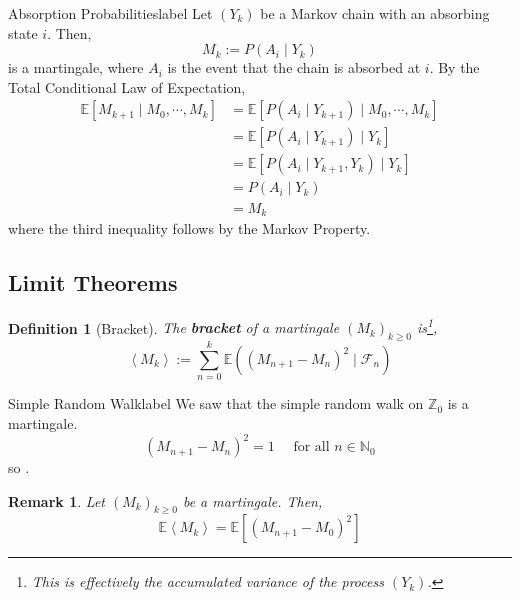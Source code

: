 \documentclass{tufte-handout}
\newtheorem{defn}[thm]{Definition}
\newtheorem{rmk}[thm]{Remark}
\begin{document}
\begin{ex}{Absorption Probabilities}{label}
  Let $(Y_k)$ be a Markov chain with an absorbing state $i$. Then,
  \[M_k := P(A_i \mid Y_k)\]
  \noindent is a martingale, where $A_i$ is the event that the chain is absorbed at $i$. By the Total Conditional Law of Expectation,
  \begin{align*}
    \mathbb{E}[M_{k+1} \mid M_0, \cdots, M_k] &= \mathbb{E}[P(A_i \mid Y_{k+1}) \mid M_0, \cdots, M_k] \\
                                              &= \mathbb{E}[P(A_i \mid Y_{k+1}) \mid Y_k] \\
                                              &= \mathbb{E}[P(A_i \mid Y_{k+1}, Y_k) \mid Y_k] \\
                                              &= P(A_i \mid Y_k) \\
                                              &= M_k
  \end{align*}
  \noindent where the third inequality follows by the Markov Property.
\end{ex}

\subsection{Limit Theorems}
\begin{defn}[Bracket]
  The \textbf{bracket} of a martingale $(M_k)_{k \geq 0}$ is\footnote{This is effectively the accumulated variance of the process $(Y_k)$.},
  \[\left\langle M_{k}\right\rangle:=\sum_{n=0}^{k} \mathbb{E}\left(\left(M_{n+1}-M_{n}\right)^{2} \mid \mathcal{F}_{n}\right)\]
\end{defn}

\begin{ex}{Simple Random Walk}{label}
  We saw that the simple random walk on $\mathbb{Z}_0$ is a martingale. 
  \[(M_{n+1} - M_n)^2 = 1 \quad \text{ for all $n \in \mathbb{N}_0$}\]
  \noindent so .
\end{ex}

\begin{rmk}
  Let $(M_k)_{k \geq 0}$ be a martingale. Then,
  \[\mathbb{E}\left\langle M_{k}\right\rangle=\mathbb{E}[\left(M_{n+1} - M_0\right)^2]\]
\end{rmk}
\end{document}
